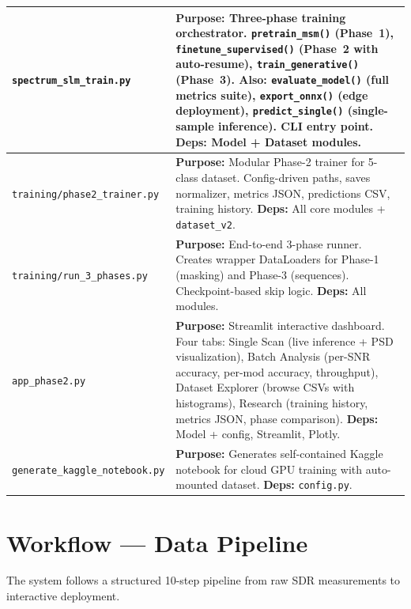 \documentclass[12pt,a4paper]{article}
\begin{document}
\begin{longtable}{@{}p{}p{}@{}}
\texttt{spectrum\_slm\_train.py} &
\textbf{Purpose:} Three-phase training orchestrator. \texttt{pretrain\_msm()} (Phase~1), \texttt{finetune\_supervised()} (Phase~2 with auto-resume), \texttt{train\_generative()} (Phase~3). Also: \texttt{evaluate\_model()} (full metrics suite), \texttt{export\_onnx()} (edge deployment), \texttt{predict\_single()} (single-sample inference). CLI entry point. \textbf{Deps:} Model + Dataset modules.\\\midrule

\texttt{training/phase2\_trainer.py} &
\textbf{Purpose:} Modular Phase-2 trainer for 5-class dataset. Config-driven paths, saves normalizer, metrics JSON, predictions CSV, training history. \textbf{Deps:} All core modules + \texttt{dataset\_v2}.\\\midrule

\texttt{training/run\_3\_phases.py} &
\textbf{Purpose:} End-to-end 3-phase runner. Creates wrapper DataLoaders for Phase-1 (masking) and Phase-3 (sequences). Checkpoint-based skip logic. \textbf{Deps:} All modules.\\\midrule

\texttt{app\_phase2.py} &
\textbf{Purpose:} Streamlit interactive dashboard. Four tabs: Single Scan (live inference + PSD visualization), Batch Analysis (per-SNR accuracy, per-mod accuracy, throughput), Dataset Explorer (browse CSVs with histograms), Research (training history, metrics JSON, phase comparison). \textbf{Deps:} Model + config, Streamlit, Plotly.\\\midrule

\texttt{generate\_kaggle\_notebook.py} &
\textbf{Purpose:} Generates self-contained Kaggle notebook for cloud GPU training with auto-mounted dataset. \textbf{Deps:} \texttt{config.py}.\\
\bottomrule
\end{longtable}

\section{Workflow --- Data Pipeline}

The system follows a structured 10-step pipeline from raw SDR measurements to interactive deployment.
\end{document}
